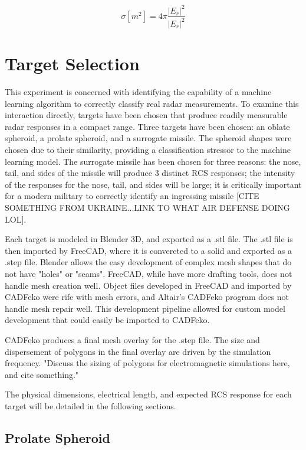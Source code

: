 \begin{equation}\label{eq:ieee_rcs}
    \sigma [m^2] = 4\pi \frac{|E_{r}|^2}{|E_{r}|^2}
\end{equation}

\section{Target Selection}
\label{sec:anothersectionRefName}

This experiment is concerned with identifying the capability of a machine learning algorithm to correctly classify real radar measurements. To examine this interaction directly, targets have been chosen that produce readily measurable radar responses in a compact range. Three targets have been chosen:  an oblate spheroid, a prolate spheroid, and a surrogate missile. The spheroid shapes were chosen due to their similarity, providing a classification stressor to the machine learning model. The surrogate missile has been chosen for three reasons:  the nose, tail, and sides of the missile will produce 3 distinct RCS responses; the intensity of the responses for the nose, tail, and sides will be large; it is critically important for a modern military to correctly identify an ingressing missile [CITE SOMETHING FROM UKRAINE...LINK TO WHAT AIR DEFENSE DOING LOL].

Each target is modeled in Blender 3D, and exported as a .stl file. The .stl file is then imported by FreeCAD, where it is convereted to a solid and exported as a .step file. Blender allows the easy development of complex mesh shapes that do not have "holes" or "seams". FreeCAD, while have more drafting tools, does not handle mesh creation well. Object files developed in FreeCAD and imported by CADFeko were rife with mesh errors, and Altair's CADFeko program does not handle mesh repair well. This development pipeline allowed for custom model development that could easily be imported to CADFeko.

CADFeko produces a final mesh overlay for the .step file. The size and dispersement of polygons in the final overlay are driven by the simulation frequency. "Discuss the sizing of polygons for electromagnetic simulations here, and cite something."

The physical dimensions, electrical length, and expected RCS response for each target will be detailed in the following sections.

\subsection{Prolate Spheroid}

